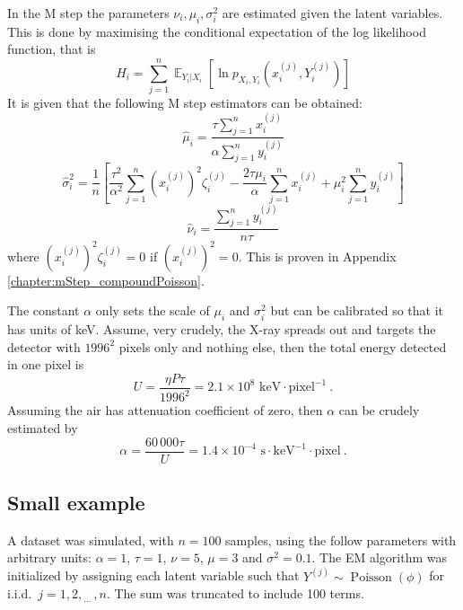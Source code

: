 \documentclass[12pt]{report}
\DeclareMathOperator{\expectation}{\mathbb{E}}
\DeclareMathOperator{\poisson}{Poisson}
\newcommand{\dotdotdot}{_{\phantom{.}\cdots}}
\begin{document}
In the M step the parameters $\nu_i,\mu_i,\sigma_i^2$ are estimated given the latent variables. This is done by maximising the conditional expectation of the log likelihood function, that is
\begin{equation}
H_i=\sum_{j=1}^n\expectation_{Y_i|X_i}\left[\ln p_{X_i,Y_i}\left(x_i^{(j)},Y_i^{(j)}\right)\right]
\end{equation}
It is given that the following M step estimators can be obtained:
\begin{equation}
\widehat{\mu}_i=\frac{\tau\sum_{j=1}^nx_i^{(j)}}{\alpha\sum_{j=1}^ny_i^{(j)}}
\end{equation}
\begin{equation}
\widehat{\sigma}_i^2=\frac{1}{n}\left[
\frac{\tau^2}{\alpha^2}\sum_{j=1}^n\left(x_i^{(j)}\right)^2\zeta_i^{(j)}
-\frac{2\tau\mu_i}{\alpha}\sum_{j=1}^nx_i^{(j)}
+\mu_i^2\sum_{j=1}^ny_i^{(j)}
\right]
\end{equation}
\begin{equation}
\widehat{\nu}_i=\frac{\sum_{j=1}^ny_i^{(j)}}{n\tau}
\end{equation}
where $\left(x_i^{(j)}\right)^2\zeta_i^{(j)}=0$ if $\left(x_i^{(j)}\right)^2=0$. This is proven in Appendix \ref{chapter:mStep_compoundPoisson}.

The constant $\alpha$ only sets the scale of $\mu_i$ and $\sigma_i^2$ but can be calibrated so that it has units of keV. Assume, very crudely, the X-ray spreads out and targets the detector with $1996^2$ pixels only and nothing else, then the total energy detected in one pixel is
\begin{equation}
U=\frac{\eta P\tau}{1996^2}=2.1\times10^{8}\text{ keV}\cdot\text{pixel}^{-1} \ .
\end{equation}
Assuming the air has attenuation coefficient of zero, then $\alpha$ can be crudely estimated by
\begin{equation}
\alpha = \frac{60\,000 \tau}{U} = 1.4\times10^{-4}\text{ s}\cdot\text{keV}^{-1}\cdot\text{pixel} \ .
\end{equation}

\subsection{Small example}
A dataset was simulated, with $n=100$ samples, using the follow parameters with arbitrary units: $\alpha=1$, $\tau=1$, $\nu=5$, $\mu=3$ and $\sigma^2=0.1$. The EM algorithm was initialized by assigning each latent variable such that $Y^{(j)}\sim\poisson(\phi)$ for i.i.d.~$j=1,2,\dotdotdot,n$. The sum was truncated to include 100 terms.
\end{document}

